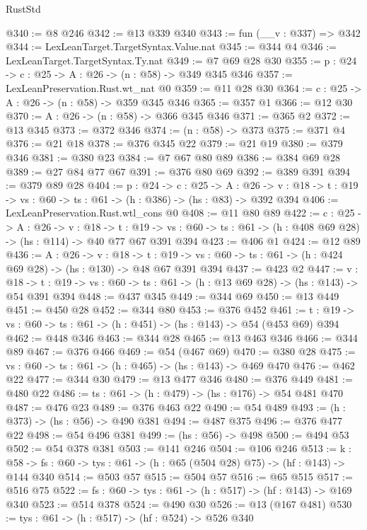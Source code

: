 \begin{lexlean}{RustStd}
\begin{coremodule}
@340 := @8 @246
@342 := @13 @339 @340
@343 := fun (__v : @337) => @342
@344 := LexLeanTarget.TargetSyntax.Value.nat
@345 := @344 @4
@346 := LexLeanTarget.TargetSyntax.Ty.nat
@349 := @7 @69 @28 @30
@355 := {p : @24} -> {c : @25} -> {A : @26} -> (n : @58) -> @349 @345 @346
@357 := LexLeanPreservation.Rust.wt_nat @0
@359 := @11 @28 @30
@364 := {c : @25} -> {A : @26} -> (n : @58) -> @359 @345 @346
@365 := @357 @1
@366 := @12 @30
@370 := {A : @26} -> (n : @58) -> @366 @345 @346
@371 := @365 @2
@372 := @13 @345
@373 := @372 @346
@374 := (n : @58) -> @373
@375 := @371 @4
@376 := @21 @18
@378 := @376 @345 @22
@379 := @21 @19
@380 := @379 @346
@381 := @380 @23
@384 := @7 @67 @80 @89
@386 := @384 @69 @28
@389 := @27 @84 @77 @67
@391 := @376 @80 @69
@392 := @389 @391
@394 := @379 @89 @28
@404 := {p : @24} ->
  {c : @25} ->
  {A : @26} ->
  {v : @18} -> {t : @19} -> {vs : @60} -> {ts : @61} -> (h : @386) -> (hs : @83) -> @392 @394
@406 := LexLeanPreservation.Rust.wtl_cons @0
@408 := @11 @80 @89
@422 := {c : @25} ->
  {A : @26} ->
  {v : @18} ->
  {t : @19} ->
  {vs : @60} -> {ts : @61} -> (h : @408 @69 @28) -> (hs : @114) -> @40 @77 @67 @391 @394
@423 := @406 @1
@424 := @12 @89
@436 := {A : @26} ->
  {v : @18} ->
  {t : @19} -> {vs : @60} -> {ts : @61} -> (h : @424 @69 @28) -> (hs : @130) -> @48 @67 @391 @394
@437 := @423 @2
@447 := {v : @18} ->
  {t : @19} -> {vs : @60} -> {ts : @61} -> (h : @13 @69 @28) -> (hs : @143) -> @54 @391 @394
@448 := @437 @345
@449 := @344 @69
@450 := @13 @449
@451 := @450 @28
@452 := @344 @80
@453 := @376 @452
@461 := {t : @19} -> {vs : @60} -> {ts : @61} -> (h : @451) -> (hs : @143) -> @54 (@453 @69) @394
@462 := @448 @346
@463 := @344 @28
@465 := @13 @463 @346
@466 := @344 @89
@467 := @376 @466
@469 := @54 (@467 @69)
@470 := @380 @28
@475 := {vs : @60} -> {ts : @61} -> (h : @465) -> (hs : @143) -> @469 @470
@476 := @462 @22
@477 := @344 @30
@479 := @13 @477 @346
@480 := @376 @449
@481 := @480 @22
@486 := {ts : @61} -> (h : @479) -> (hs : @176) -> @54 @481 @470
@487 := @476 @23
@489 := @376 @463 @22
@490 := @54 @489
@493 := (h : @373) -> (hs : @56) -> @490 @381
@494 := @487 @375
@496 := @376 @477 @22
@498 := @54 @496 @381
@499 := (hs : @56) -> @498
@500 := @494 @53
@502 := @54 @378 @381
@503 := @141 @246
@504 := @106 @246
@513 := {k : @58} ->
  {fs : @60} -> {tys : @61} -> (h : @65 (@504 @28) @75) -> (hf : @143) -> @144 @340
@514 := @503 @57
@515 := @504 @57
@516 := @65 @515
@517 := @516 @75
@522 := {fs : @60} -> {tys : @61} -> (h : @517) -> (hf : @143) -> @169 @340
@523 := @514 @378
@524 := @490 @30
@526 := @13 (@167 @481)
@530 := {tys : @61} -> (h : @517) -> (hf : @524) -> @526 @340

\end{coremodule}
\end{lexlean}
